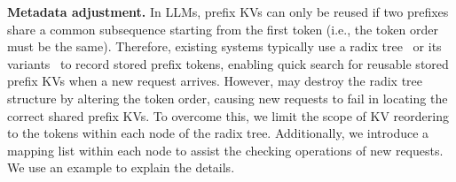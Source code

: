 
\noindent \textbf{Metadata adjustment.}
In LLMs, prefix KVs can only be reused if two prefixes share a common subsequence starting from the first token 
(i.e., the token order must be the same).
Therefore, existing systems typically use a radix tree~\cite{sglang-arxiv23, chunkattention-arxiv24} or its variants~\cite{ragcache-arxiv24} to record stored prefix tokens, enabling quick search for reusable stored prefix KVs when a new request arrives. 
However, \techba{} may destroy the radix tree structure by altering the token order, 
causing new requests to fail in locating the correct shared prefix KVs.
To overcome this, we limit the scope of KV reordering to the tokens within each node of the radix tree. Additionally, we introduce a mapping list within each node to assist the checking operations of new requests.
We use an example to explain the details.

